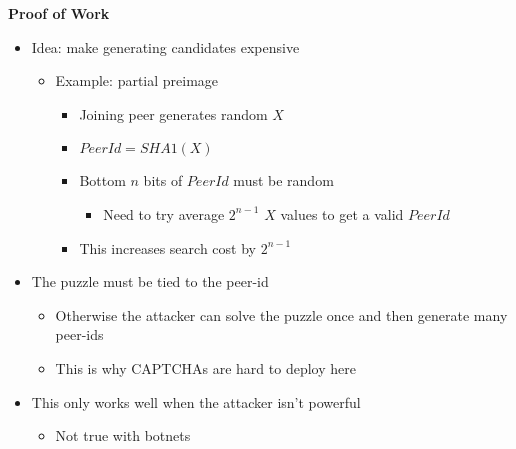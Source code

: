 \documentclass[helvetica]{seminar}
\newcommand{\heading}[1]{%
  \begin{center} 
    \large\bf 
    #1 
  \end{center} 
  \vspace{.4 in}}
\begin{document}
\begin{slide}
\heading{Proof of Work}

\vspace{-.3 in}
\begin{itemize}
\item Idea: make generating candidates expensive
\begin{itemize}
\item Example: partial preimage
\begin{itemize}
\item Joining peer generates random $X$ 
\item $PeerId = SHA1(X)$
\item Bottom $n$ bits of $PeerId$ must be random
\begin{itemize}
\item Need to try average $2^{n-1}$ $X$ values to get a valid $PeerId$
\end{itemize}
\item This increases search cost by $2^{n-1}$
\end{itemize}
\end{itemize}
\item The puzzle must be tied to the peer-id
\begin{itemize}
\item Otherwise the attacker can solve the puzzle once and then generate many peer-ids
\item This is why CAPTCHAs are hard to deploy here
\end{itemize}
\item This only works well when the attacker isn't powerful
\begin{itemize}
\item Not true with botnets
\end{itemize}
\end{itemize}
\end{slide}
\end{document}
